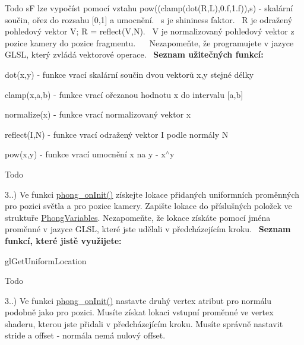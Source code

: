 \begin{DoxyRefDesc}{Todo}
 s\+F lze vypočíst pomocí vztahu pow((clamp(dot(\+R,\+L),0.\+f,1.\+f)),s) -\/ skalární součin, ořez do rozsahu \mbox{[}0,1\mbox{]} a umocnění.~\newline
 s je shininess faktor.~\newline
 R je odražený pohledový vektor V; R = reflect(\+V,\+N).~\newline
 V je normalizovaný pohledový vektor z pozice kamery do pozice fragmentu.~\newline
 ~\newline
 Nezapomeňte, že programujete v jazyce G\+L\+S\+L, který zvládá vektorové operace.~\newline
 {\bfseries Seznam užitečných funkcí\+:}
\begin{DoxyItemize}
\item dot(x,y) -\/ funkce vrací skalární součin dvou vektorů x,y stejné délky
\item clamp(x,a,b) -\/ funkce vrací ořezanou hodnotu x do intervalu \mbox{[}a,b\mbox{]}
\item normalize(x) -\/ funkce vrací normalizovaný vektor x
\item reflect(\+I,\+N) -\/ funkce vrací odražený vektor I podle normály N
\item pow(x,y) -\/ funkce vrací umocnění x na y -\/ x$^\wedge$y 
\end{DoxyItemize}\end{DoxyRefDesc}
\begin{DoxyRefDesc}{Todo}
\item[\hyperlink{todo__todo000006}{Todo}]3..) Ve funkci \hyperlink{student_8h_ac2adb2ba4e748239b9db4d037584d3cc}{phong\+\_\+on\+Init()} získejte lokace přidaných uniformních proměnných pro pozici světla a pro pozice kamery. Zapište lokace do příslušných položek ve struktuře \hyperlink{structPhongVariables}{Phong\+Variables}. Nezapomeňte, že lokace získáte pomocí jména proměnné v jazyce G\+L\+S\+L, které jste udělali v předcházejícím kroku.~\newline
 {\bfseries Seznam funkcí, které jistě využijete\+:}
\begin{DoxyItemize}
\item gl\+Get\+Uniform\+Location 
\end{DoxyItemize}\end{DoxyRefDesc}


\begin{DoxyRefDesc}{Todo}
\item[\hyperlink{todo__todo000007}{Todo}]3..) Ve funkci \hyperlink{student_8h_ac2adb2ba4e748239b9db4d037584d3cc}{phong\+\_\+on\+Init()} nastavte druhý vertex atribut pro normálu podobně jako pro pozici. Musíte získat lokaci vstupní proměnné ve vertex shaderu, kterou jste přidali v předcházejícím kroku. Musíte správně nastavit stride a offset -\/ normála nemá nulový offset.~\newline
 \end{DoxyRefDesc}



